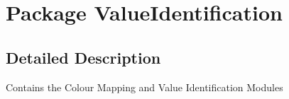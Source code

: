 \hypertarget{namespace_value_identification}{}\section{Package Value\+Identification}
\label{namespace_value_identification}


\subsection{Detailed Description}
Contains the Colour Mapping and Value Identification Modules 